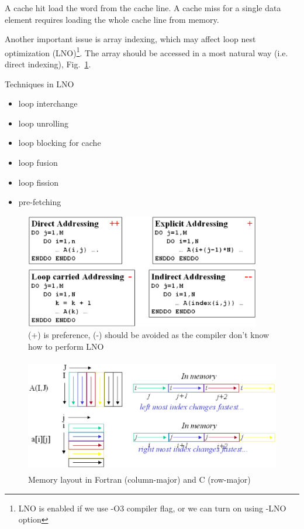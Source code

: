 \begin{framed}
  A cache hit load the word from the cache line. A cache miss for a
  single data element requires loading the whole cache line from
  memory.
\end{framed}

Another important issue is array indexing, which may affect loop nest
optimization (LNO)\footnote{LNO is enabled if we use -O3
  compiler flag, or we can turn on using -LNO option}. The
array should be accessed in a most natural way (i.e. direct indexing), Fig.~\ref{fig:array_index}.

\begin{framed}
  Techniques in LNO
  \begin{itemize}
  \item loop interchange
  \item loop unrolling
  \item loop blocking for cache
  \item loop fusion
  \item loop fission 
  \item  pre-fetching
  \end{itemize}
\end{framed}

\begin{figure}[hbt]
  \centerline{\includegraphics[height=5cm,
    angle=0]{./images/array_indexing.eps}}
  \caption{(+) is preference, (-) should be avoided as the compiler
    don't know how to perform LNO}
  \label{fig:array_index}
\end{figure}


\begin{figure}[hbt]
  \centerline{\includegraphics[height=5cm,
    angle=0]{./images/memory_layout.eps}}
  \caption{Memory layout in Fortran (column-major) and C (row-major)}
  \label{fig:memory_layout}
\end{figure}

